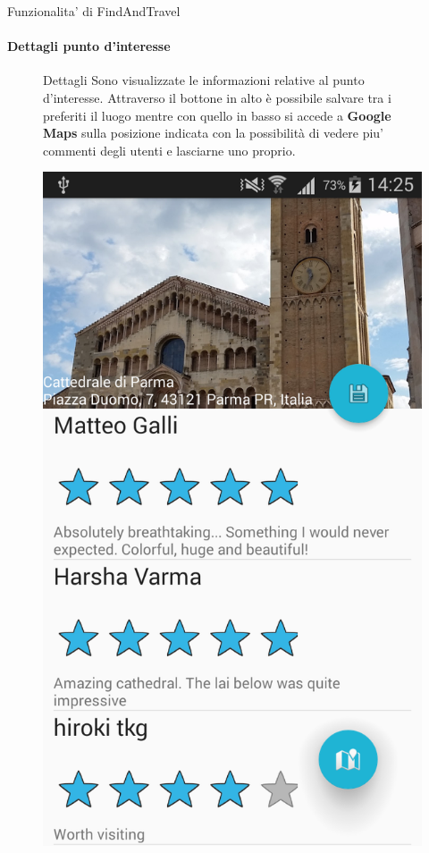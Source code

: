 \documentclass[10pt,a4paper]{beamer}
\begin{document}
\begin{frame}{Funzionalita' di FindAndTravel}
\framesubtitle{Dettagli punto d'interesse}
\begin{figure}
\begin{minipage}{0.45\textwidth}
 \begin{block}{Dettagli}
  Sono visualizzate le informazioni relative al punto d'interesse. Attraverso il bottone in alto è possibile salvare tra i preferiti il luogo mentre con quello in basso si accede a \textbf{Google Maps} sulla posizione indicata con la possibilità di vedere piu' commenti degli utenti e lasciarne uno proprio. 
 \end{block}
\end{minipage}
\hfill
\begin{minipage}{0.35\textwidth}
  \includegraphics[scale=0.1]{dettagli.png}
\end{minipage}
\end{figure}
\end{frame}
\end{document}
